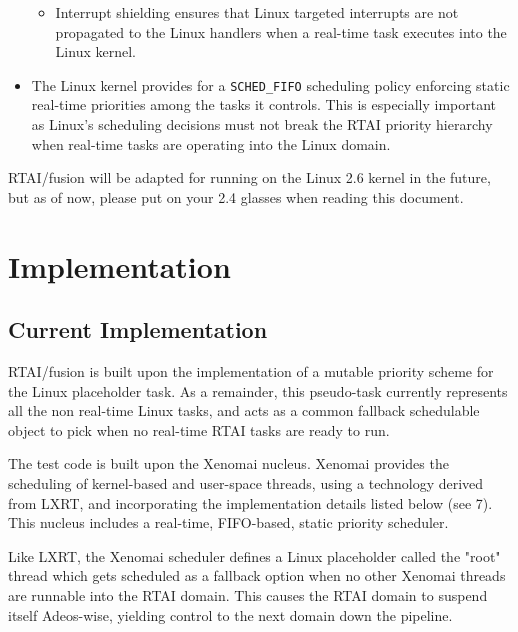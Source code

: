\begin{itemize}
\begin{itemize}
        \item Interrupt shielding ensures that Linux targeted interrupts
        are not propagated to the Linux handlers when a real-time
        task executes into the Linux kernel.

        \end{itemize}

\item The Linux kernel provides for a \texttt{SCHED\_FIFO} scheduling policy
enforcing static real-time priorities among the tasks it
controls. This is especially important as Linux's scheduling decisions
must not break the RTAI priority hierarchy when real-time tasks are
operating into the Linux domain.

\end{itemize}

RTAI/fusion will be adapted for running on the Linux 2.6 kernel in
the future, but as of now, please put on your 2.4 glasses when reading
this document.


\section{Implementation}

\subsection{Current Implementation}

RTAI/fusion is built upon the implementation of a mutable priority
scheme for the Linux placeholder task. As a remainder, this
pseudo-task currently represents all the non real-time Linux tasks,
and acts as a common fallback schedulable object to pick when no
real-time RTAI tasks are ready to run.

The test code is built upon the Xenomai nucleus. Xenomai provides the
scheduling of kernel-based and user-space threads, using a technology
derived from LXRT, and incorporating the implementation details listed
below (see 7). This nucleus includes a real-time, FIFO-based, static
priority scheduler.

Like LXRT, the Xenomai scheduler defines a Linux placeholder called
the "root" thread which gets scheduled as a fallback option when no
other Xenomai threads are runnable into the RTAI domain. This causes
the RTAI domain to suspend itself Adeos-wise, yielding control to the
next domain down the pipeline.

